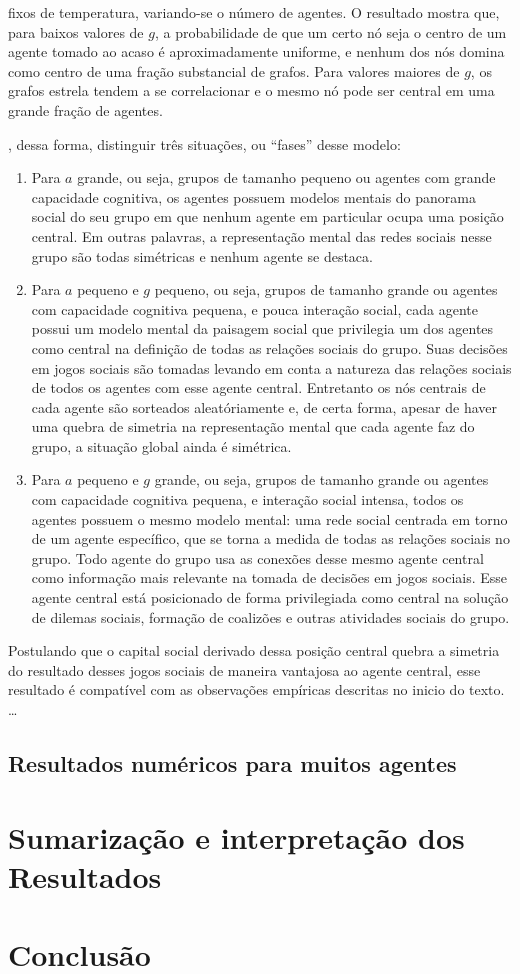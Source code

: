 fixos de temperatura, variando-se o número de agentes. O resultado mostra que, para baixos valores de $g$, a probabilidade de que um certo nó seja o centro de um agente tomado ao acaso é aproximadamente uniforme, e nenhum dos nós domina como centro de uma fração substancial de grafos. Para valores maiores de $g$, os grafos estrela tendem a se correlacionar e o mesmo nó pode ser central em uma grande fração de agentes. 

, dessa forma, distinguir três situações, ou ``fases'' desse modelo:
\begin{enumerate}
 \item Para $a$ grande, ou seja, grupos de tamanho pequeno ou agentes com grande capacidade cognitiva, os agentes possuem modelos mentais do panorama social do seu grupo em que nenhum agente em particular ocupa uma posição central. Em outras palavras, a representação mental das redes sociais nesse grupo são todas simétricas e nenhum agente se destaca. 

 \item Para $a$ pequeno e $g$ pequeno, ou seja, grupos de tamanho grande ou agentes com capacidade cognitiva pequena, e pouca interação social, cada agente possui um modelo mental da paisagem social que privilegia um dos agentes como central na definição de todas as relações sociais do grupo. Suas decisões em jogos sociais são tomadas levando em conta a natureza das relações sociais de todos os agentes com esse agente central. Entretanto os nós centrais de cada agente são sorteados aleatóriamente e, de certa forma, apesar de haver uma quebra de simetria na representação mental que cada agente faz do grupo, a situação global ainda é simétrica. 

 \item Para $a$ pequeno e $g$ grande,  ou seja, grupos de tamanho grande ou agentes com capacidade cognitiva pequena, e interação social intensa, todos os agentes possuem o mesmo modelo mental: uma rede social centrada em torno de um agente específico, que se torna a medida de todas as relações sociais no grupo. Todo agente do grupo usa as conexões desse mesmo agente central como informação mais relevante na tomada de decisões em jogos sociais. Esse agente central está posicionado de forma privilegiada como central na solução de dilemas sociais, formação de coalizões e outras atividades sociais do grupo. 
\end{enumerate}
Postulando que o capital social derivado dessa posição central quebra a simetria do resultado desses jogos sociais de maneira vantajosa ao agente central, esse resultado é compatível com as observações empíricas descritas no inicio do texto. 
\ldots
\subsection{Resultados numéricos para muitos agentes}
\section{Sumarização e interpretação dos Resultados}
\section{Conclusão}
